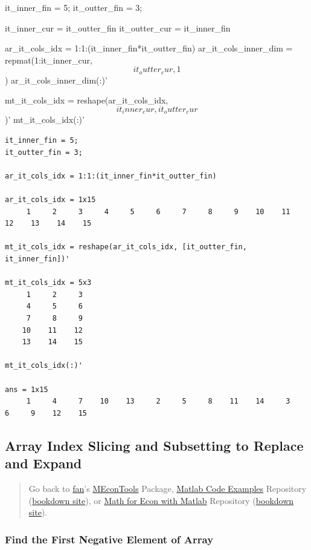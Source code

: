 \documentclass[
]{book}
\begin{document}
it\_inner\_fin = 5; it\_outter\_fin = 3;

it\_inner\_cur = it\_outter\_fin it\_outter\_cur = it\_inner\_fin

ar\_it\_cols\_idx = 1:1:(it\_inner\_fin*it\_outter\_fin) ar\_it\_cols\_inner\_dim
= repmat(1:it\_inner\_cur, \[it_outter_cur, 1\]) ar\_it\_cols\_inner\_dim(:)'

mt\_it\_cols\_idx = reshape(ar\_it\_cols\_idx, \[it_inner_cur,
it_outter_cur\])' mt\_it\_cols\_idx(:)'

\begin{verbatim}
it_inner_fin = 5;
it_outter_fin = 3;

ar_it_cols_idx = 1:1:(it_inner_fin*it_outter_fin)

ar_it_cols_idx = 1x15    
     1     2     3     4     5     6     7     8     9    10    11    12    13    14    15

mt_it_cols_idx = reshape(ar_it_cols_idx, [it_outter_fin, it_inner_fin])'

mt_it_cols_idx = 5x3    
     1     2     3
     4     5     6
     7     8     9
    10    11    12
    13    14    15

mt_it_cols_idx(:)'

ans = 1x15    
     1     4     7    10    13     2     5     8    11    14     3     6     9    12    15
\end{verbatim}

\hypertarget{array-index-slicing-and-subsetting-to-replace-and-expand}{%
\subsection{Array Index Slicing and Subsetting to Replace and Expand}\label{array-index-slicing-and-subsetting-to-replace-and-expand}}

\begin{quote}
Go back to \href{http://fanwangecon.github.io/}{fan}'s \href{https://fanwangecon.github.io/MEconTools/}{MEconTools} Package, \href{https://fanwangecon.github.io/M4Econ/}{Matlab Code Examples} Repository (\href{https://fanwangecon.github.io/M4Econ/bookdown}{bookdown site}), or \href{https://fanwangecon.github.io/Math4Econ/}{Math for Econ with Matlab} Repository (\href{https://fanwangecon.github.io/Math4Econ/bookdown}{bookdown site}).
\end{quote}

\hypertarget{find-the-first-negative-element-of-array}{%
\subsubsection{Find the First Negative Element of Array}\label{find-the-first-negative-element-of-array}}
\end{document}
